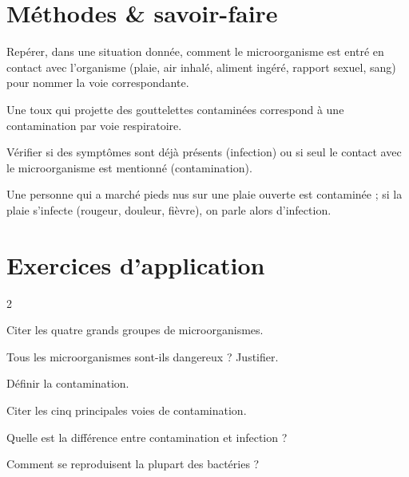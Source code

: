 \section{Méthodes \& savoir-faire}

Repérer, dans une situation donnée, comment le microorganisme est entré en contact
avec l'organisme (plaie, air inhalé, aliment ingéré, rapport sexuel, sang) pour nommer
la voie correspondante.
\begin{exemple}
Une toux qui projette des gouttelettes contaminées correspond à une contamination par
voie respiratoire.
\end{exemple}

Vérifier si des symptômes sont déjà présents (infection) ou si seul le contact avec le
microorganisme est mentionné (contamination).
\begin{exemple}
Une personne qui a marché pieds nus sur une plaie ouverte est contaminée ; si la plaie
s'infecte (rougeur, douleur, fièvre), on parle alors d'infection.
\end{exemple}

\section{Exercices d'application}
\begin{multicols}{2}

\exo{} Citer les quatre grands groupes de microorganismes.

\exo{} Tous les microorganismes sont-ils dangereux ? Justifier.

\exo{} Définir la contamination.

\exo{} Citer les cinq principales voies de contamination.

\exo{} Quelle est la différence entre contamination et infection ?

\exo{} Comment se reproduisent la plupart des bactéries ?

\end{multicols}

